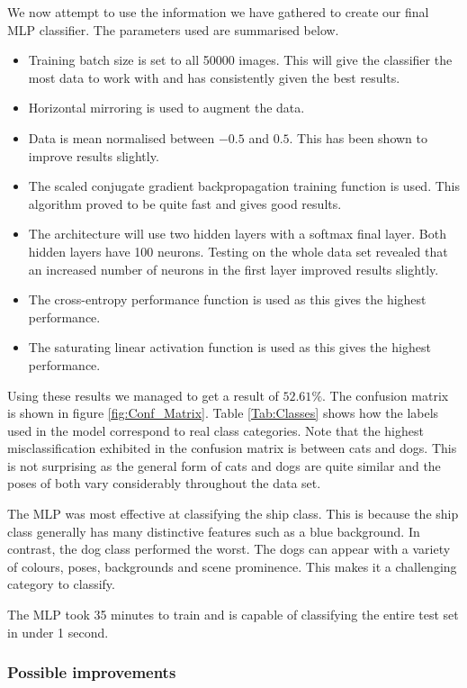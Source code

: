 We now attempt to use the information we have gathered to create our final MLP classifier. The parameters used are summarised below.
\begin{itemize}
    \item Training batch size is set to all 50000 images. This will give the classifier the most data to work with and has consistently given the best results.
    \item Horizontal mirroring is used to augment the data.
    \item Data is mean normalised between $-0.5$ and $0.5$. This has been shown to improve results slightly.
    \item The scaled conjugate gradient backpropagation training function is used. This algorithm proved to be quite fast and gives good results.
    \item The architecture will use two hidden layers with a softmax final layer. Both hidden layers have 100 neurons. Testing on the whole data set revealed that an increased number of neurons in the first layer improved results slightly.
    \item The cross-entropy performance function is used as this gives the highest performance.
    \item The saturating linear activation function is used as this gives the highest performance.
\end{itemize}

Using these results we managed to get a result of $52.61\%$. The confusion matrix is shown in figure \ref{fig:Conf_Matrix}. Table \ref{Tab:Classes} shows how the labels used in the model correspond to real class categories. Note that the highest misclassification exhibited in the confusion matrix is between cats and dogs. This is not surprising as the general form of cats and dogs are quite similar and the poses of both vary considerably throughout the data set.

The MLP was most effective at classifying the ship class. This is because the ship class generally has many distinctive features such as a blue background. In contrast, the dog class performed the worst. The dogs can appear with a variety of colours, poses, backgrounds and scene prominence. This makes it a challenging category to classify.

The MLP took 35 minutes to train and is capable of classifying the entire test set in under 1 second.

\subsubsection{Possible improvements}

